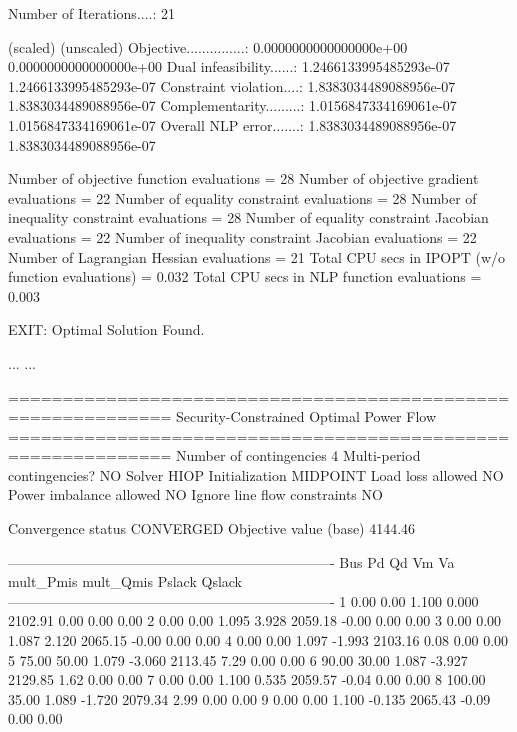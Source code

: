 Number of Iterations....: 21

                                   (scaled)                 (unscaled)
Objective...............:   0.0000000000000000e+00    0.0000000000000000e+00
Dual infeasibility......:   1.2466133995485293e-07    1.2466133995485293e-07
Constraint violation....:   1.8383034489088956e-07    1.8383034489088956e-07
Complementarity.........:   1.0156847334169061e-07    1.0156847334169061e-07
Overall NLP error.......:   1.8383034489088956e-07    1.8383034489088956e-07


Number of objective function evaluations             = 28
Number of objective gradient evaluations             = 22
Number of equality constraint evaluations            = 28
Number of inequality constraint evaluations          = 28
Number of equality constraint Jacobian evaluations   = 22
Number of inequality constraint Jacobian evaluations = 22
Number of Lagrangian Hessian evaluations             = 21
Total CPU secs in IPOPT (w/o function evaluations)   =      0.032
Total CPU secs in NLP function evaluations           =      0.003

EXIT: Optimal Solution Found.

...
...

=============================================================
Security-Constrained Optimal Power Flow
=============================================================
Number of contingencies             4
Multi-period contingencies?         NO
Solver                              HIOP
Initialization                      MIDPOINT
Load loss allowed                   NO
Power imbalance allowed             NO
Ignore line flow constraints        NO


Convergence status                  CONVERGED
Objective value (base)              4144.46

----------------------------------------------------------------------
Bus        Pd      Qd      Vm      Va      mult_Pmis      mult_Qmis      Pslack         Qslack        
----------------------------------------------------------------------
1         0.00    0.00   1.100   0.000      2102.91         0.00         0.00         0.00
2         0.00    0.00   1.095   3.928      2059.18        -0.00         0.00         0.00
3         0.00    0.00   1.087   2.120      2065.15        -0.00         0.00         0.00
4         0.00    0.00   1.097  -1.993      2103.16         0.08         0.00         0.00
5        75.00   50.00   1.079  -3.060      2113.45         7.29         0.00         0.00
6        90.00   30.00   1.087  -3.927      2129.85         1.62         0.00         0.00
7         0.00    0.00   1.100   0.535      2059.57        -0.04         0.00         0.00
8       100.00   35.00   1.089  -1.720      2079.34         2.99         0.00         0.00
9         0.00    0.00   1.100  -0.135      2065.43        -0.09         0.00         0.00

